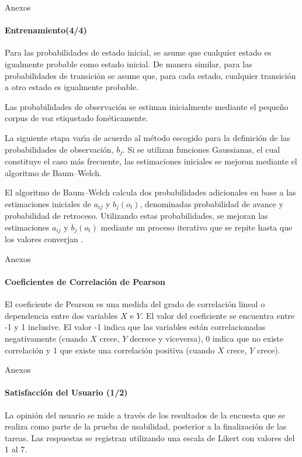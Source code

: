\begin{frame}[noframenumbering]{Anexos}
\framesubtitle{Entrenamiento(4/4)}

Para las probabilidades de estado inicial, se asume que cualquier estado es igualmente probable 
como estado inicial. De manera similar, para las probabilidades de transici\'on se asume que, para cada estado, cualquier transici\'on a otro estado es igualmente probable.

Las probabilidades de observaci\'on se estiman inicialmente mediante el peque\~no corpus 
de voz etiquetado fon\'eticamente.

La siguiente etapa var{\'\i}a de acuerdo al m\'etodo escogido para la definici\'on de las probabilidades
de observaci\'on, $b_j$. Si se utilizan funciones Gaussianas, el cual constituye el caso m\'as
frecuente, las estimaciones iniciales se mejoran mediante el algoritmo de Baum--Welch.

El algoritmo de Baum--Welch calcula dos probabilidades adicionales en base a las estimaciones
iniciales de $a_{ij}$ y $b_j(o_t)$, denominadas probabilidad de avance y probabilidad de retroceso. 
Utilizando estas probabilidades, se mejoran las estimaciones $a_{ij}$ y $b_j(o_t)$ mediante
un proceso iterativo que se repite hasta que los valores converjan \cite{Rabiner89atutorial}.
\end{frame}

\begin{frame}[noframenumbering]{Anexos}
\framesubtitle{Coeficientes de Correlaci\'on de Pearson}
El coeficiente de Pearson es una medida del grado de correlaci\'on lineal o dependencia entre dos 
variables $X$ e $Y$. El valor del coeficiente se encuentra entre -1 y 1 inclusive. 
El valor -1 indica que las variables est\'an correlacionadas negativamente 
(cuando $X$ crece, $Y$ decrece y viceversa), 0 indica que no existe correlaci\'on y 1 que existe una 
correlaci\'on positiva (cuando $X$ crece, $Y$ crece).
\end{frame}

\begin{frame}[noframenumbering]{Anexos}
\framesubtitle{Satisfacci\'on del Usuario (1/2)}
La opini\'on del usuario se mide a trav\'es de los resultados de la encuesta que se realiza como parte de
la prueba de usabilidad, posterior a la finalizaci\'on de las tareas. Las respuestas se
registran utilizando una escala de Likert con valores del 1 al 7.
\end{frame}

